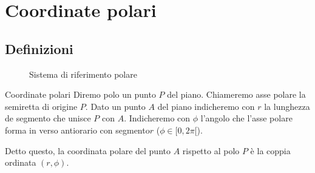 \chapter{Coordinate polari}
\section{Definizioni}
\label{Cha:CoordinatePolariTrig}
\begin{figure} %
	\centering
	
	\caption{Sistema di riferimento polare}\label{fig:coodpolarpolari}
\end{figure}
\begin{definizionet}{Coordinate polari}{}
Diremo polo un punto $P$ del piano.
Chiameremo asse polare la semiretta di origine $P$.
Dato un punto $A$ del piano indicheremo con $r$ la lunghezza de segmento che unisce $P$ con $A$.
Indicheremo con $\phi$ l'angolo che l'asse polare forma in verso antiorario con segmento$r$ ($\phi\in[0,2\pi[$). 

Detto questo, la coordinata polare del punto $A$ rispetto al polo $P$ è la coppia ordinata $(r,\phi)$. 
\end{definizionet}

